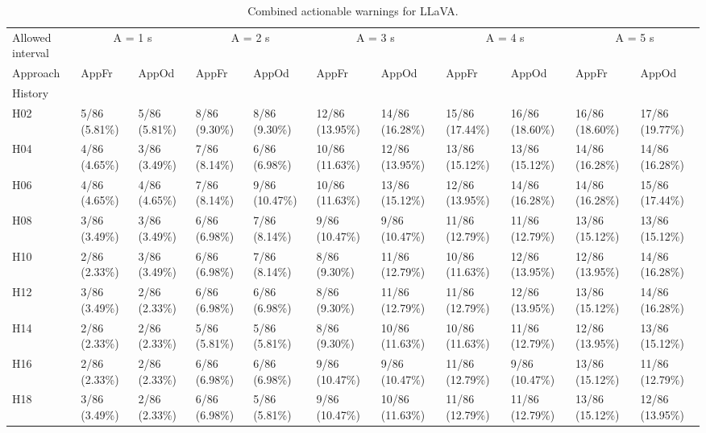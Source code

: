 \begin{table}[tbp]
\caption{Combined actionable warnings for LLaVA.}
\label{tab:rq4-llava-actionable-paper-table}
\begin{tabular}{lllllllllll}
\toprule
Allowed interval & \multicolumn{2}{c}{A = 1 s} & \multicolumn{2}{c}{A = 2 s} & \multicolumn{2}{c}{A = 3 s} & \multicolumn{2}{c}{A = 4 s} & \multicolumn{2}{c}{A = 5 s} \\
Approach & AppFr & AppOd & AppFr & AppOd & AppFr & AppOd & AppFr & AppOd & AppFr & AppOd \\
History &  &  &  &  &  &  &  &  &  &  \\
\midrule
H02 & 5/86 (5.81\%) & 5/86 (5.81\%) & 8/86 (9.30\%) & 8/86 (9.30\%) & 12/86 (13.95\%) & 14/86 (16.28\%) & 15/86 (17.44\%) & 16/86 (18.60\%) & 16/86 (18.60\%) & 17/86 (19.77\%) \\
H04 & 4/86 (4.65\%) & 3/86 (3.49\%) & 7/86 (8.14\%) & 6/86 (6.98\%) & 10/86 (11.63\%) & 12/86 (13.95\%) & 13/86 (15.12\%) & 13/86 (15.12\%) & 14/86 (16.28\%) & 14/86 (16.28\%) \\
H06 & 4/86 (4.65\%) & 4/86 (4.65\%) & 7/86 (8.14\%) & 9/86 (10.47\%) & 10/86 (11.63\%) & 13/86 (15.12\%) & 12/86 (13.95\%) & 14/86 (16.28\%) & 14/86 (16.28\%) & 15/86 (17.44\%) \\
H08 & 3/86 (3.49\%) & 3/86 (3.49\%) & 6/86 (6.98\%) & 7/86 (8.14\%) & 9/86 (10.47\%) & 9/86 (10.47\%) & 11/86 (12.79\%) & 11/86 (12.79\%) & 13/86 (15.12\%) & 13/86 (15.12\%) \\
H10 & 2/86 (2.33\%) & 3/86 (3.49\%) & 6/86 (6.98\%) & 7/86 (8.14\%) & 8/86 (9.30\%) & 11/86 (12.79\%) & 10/86 (11.63\%) & 12/86 (13.95\%) & 12/86 (13.95\%) & 14/86 (16.28\%) \\
H12 & 3/86 (3.49\%) & 2/86 (2.33\%) & 6/86 (6.98\%) & 6/86 (6.98\%) & 8/86 (9.30\%) & 11/86 (12.79\%) & 11/86 (12.79\%) & 12/86 (13.95\%) & 13/86 (15.12\%) & 14/86 (16.28\%) \\
H14 & 2/86 (2.33\%) & 2/86 (2.33\%) & 5/86 (5.81\%) & 5/86 (5.81\%) & 8/86 (9.30\%) & 10/86 (11.63\%) & 10/86 (11.63\%) & 11/86 (12.79\%) & 12/86 (13.95\%) & 13/86 (15.12\%) \\
H16 & 2/86 (2.33\%) & 2/86 (2.33\%) & 6/86 (6.98\%) & 6/86 (6.98\%) & 9/86 (10.47\%) & 9/86 (10.47\%) & 11/86 (12.79\%) & 9/86 (10.47\%) & 13/86 (15.12\%) & 11/86 (12.79\%) \\
H18 & 3/86 (3.49\%) & 2/86 (2.33\%) & 6/86 (6.98\%) & 5/86 (5.81\%) & 9/86 (10.47\%) & 10/86 (11.63\%) & 11/86 (12.79\%) & 11/86 (12.79\%) & 13/86 (15.12\%) & 12/86 (13.95\%) \\

\end{tabular}
\end{table}

